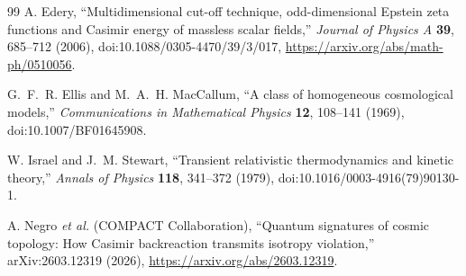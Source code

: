 \begin{thebibliography}{99}
A. Edery,
``Multidimensional cut-off technique, odd-dimensional Epstein zeta functions
and Casimir energy of massless scalar fields,''
\emph{Journal of Physics A} \textbf{39}, 685--712 (2006),
doi:10.1088/0305-4470/39/3/017,
\url{https://arxiv.org/abs/math-ph/0510056}.

G.~F.~R. Ellis and M.~A.~H. MacCallum,
``A class of homogeneous cosmological models,''
\emph{Communications in Mathematical Physics} \textbf{12}, 108--141 (1969),
doi:10.1007/BF01645908.

W. Israel and J.~M. Stewart,
``Transient relativistic thermodynamics and kinetic theory,''
\emph{Annals of Physics} \textbf{118}, 341--372 (1979),
doi:10.1016/0003-4916(79)90130-1.

A. Negro \emph{et al.} (COMPACT Collaboration),
``Quantum signatures of cosmic topology: How Casimir backreaction transmits
isotropy violation,'' arXiv:2603.12319 (2026),
\url{https://arxiv.org/abs/2603.12319}.

\end{thebibliography}
